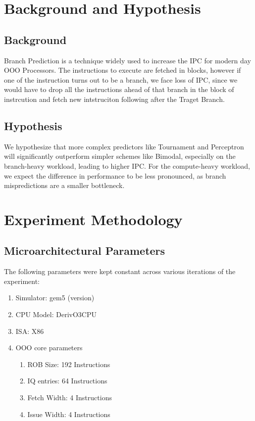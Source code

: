 \documentclass[11pt, a4paper]{article}
\begin{document}
\section{Background and Hypothesis}
\subsection{Background}
Branch Prediction is a technique widely used to increase the IPC for modern day OOO Processors. The instructions to execute are fetched in blocks, however if one of the instruction turns out to be a branch, we face loss of IPC, since we would have to drop all the instructions ahead of that branch in the block of instrcution and fetch new intstruciton following after the Traget Branch.

\subsection{Hypothesis}

We hypothesize that more complex predictors like Tournament and
Perceptron will significantly outperform simpler schemes like Bimodal,
especially on the branch-heavy workload, leading to higher IPC. For the
compute-heavy workload, we expect the difference in performance to be less
pronounced, as branch mispredictions are a smaller bottleneck.


\section{Experiment Methodology}
\subsection{Microarchitectural Parameters}
The following parameters were kept constant across various iterations of the experiment:
\begin{enumerate}
    \item Simulator: gem5 (version)
    \item CPU Model: DerivO3CPU
    \item ISA: X86
    \item OOO core parameters 
    \begin{enumerate}
        \item ROB Size: 192 Instructions
        \item IQ entries: 64 Instructions
        \item Fetch Width: 4 Instructions
        \item Issue Width: 4 Instructions
    \end{enumerate}
\end{enumerate}
\end{document}
